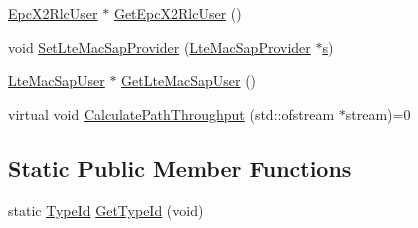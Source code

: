 \begin{DoxyCompactItemize}
\item 
\hyperlink{classns3_1_1EpcX2RlcUser}{Epc\+X2\+Rlc\+User} $\ast$ \hyperlink{classns3_1_1LteRlc_aa3751c1ef3a1f3443bd1fc05aae4e1e2}{Get\+Epc\+X2\+Rlc\+User} ()
\item 
void \hyperlink{classns3_1_1LteRlc_abb357e552cdaa153a8a8df168a882d53}{Set\+Lte\+Mac\+Sap\+Provider} (\hyperlink{classns3_1_1LteMacSapProvider}{Lte\+Mac\+Sap\+Provider} $\ast$\hyperlink{generate__test__data__lte__sinr_8m_ad83eeb3a142285d1243a08c6b7026df8}{s})
\item 
\hyperlink{classns3_1_1LteMacSapUser}{Lte\+Mac\+Sap\+User} $\ast$ \hyperlink{classns3_1_1LteRlc_aedccafdcdbe033678e745ddf39596b48}{Get\+Lte\+Mac\+Sap\+User} ()
\item 
virtual void \hyperlink{classns3_1_1LteRlc_ae5a28f7f749925a56655b672810142f5}{Calculate\+Path\+Throughput} (std\+::ofstream $\ast$stream)=0
\end{DoxyCompactItemize}
\subsection*{Static Public Member Functions}
\begin{DoxyCompactItemize}
\item 
static \hyperlink{classns3_1_1TypeId}{Type\+Id} \hyperlink{classns3_1_1LteRlc_a1f1fb44428a0a40405d5cddfeabbe489}{Get\+Type\+Id} (void)
\end{DoxyCompactItemize}
